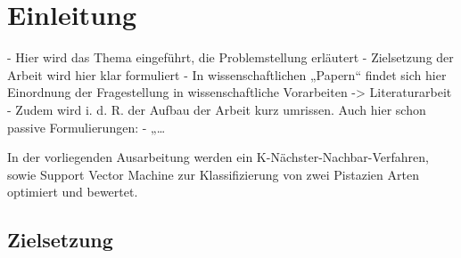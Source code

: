
\section{Einleitung}

- Hier wird das Thema eingeführt, die Problemstellung erläutert 
- Zielsetzung der Arbeit wird hier klar formuliert
- In wissenschaftlichen „Papern“  findet sich hier Einordnung der 
Fragestellung in wissenschaftliche Vorarbeiten -> Literaturarbeit 
- Zudem wird i. d. R. der Aufbau der Arbeit kurz umrissen.
Auch hier schon passive Formulierungen:
- „…


In der vorliegenden Ausarbeitung werden ein K-Nächster-Nachbar-Verfahren, sowie Support Vector Machine
zur Klassifizierung von zwei Pistazien Arten optimiert und bewertet.

\subsection{Zielsetzung}

